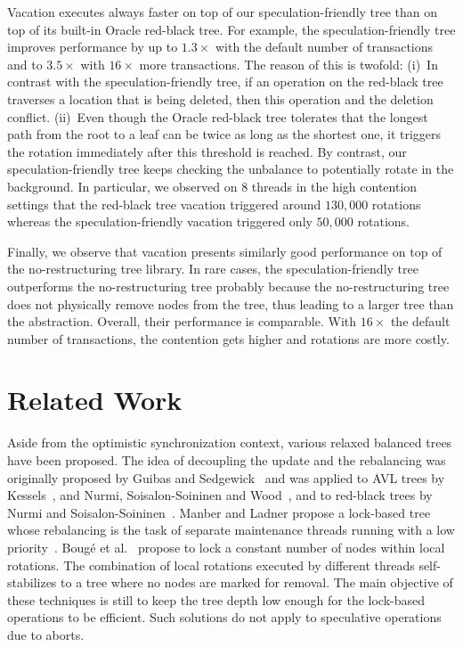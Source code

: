 Vacation executes always faster on top of our speculation-friendly tree than on top of its built-in Oracle red-black tree. 
For example, the speculation-friendly tree improves performance by up to $1.3\times$ with the default 
number of transactions and to $3.5\times$ with $16\times$ more transactions.
%
The reason of this is twofold: 
(i)~In contrast with the speculation-friendly tree, if an operation on the red-black tree traverses a location that is being 
deleted, then this operation and the deletion conflict. (ii)~Even though the Oracle red-black tree tolerates that the longest 
path from the root to a leaf can be twice as long as the shortest one, it triggers the rotation immediately after this threshold
is reached. By contrast, our speculation-friendly tree keeps checking the unbalance to potentially rotate in the background.
In particular, 
we observed on 8 threads in the high contention settings that the red-black tree vacation triggered around 
$130,000$ rotations whereas the speculation-friendly vacation triggered only $50,000$ rotations.

Finally, we observe that vacation presents similarly good performance on top of the no-restructuring tree library.
In rare cases, the speculation-friendly tree outperforms the no-restructuring tree probably because the no-restructuring tree
does not physically remove nodes from the tree,  thus leading to a larger tree than the abstraction.
Overall, their performance is comparable. With $16\times$ the default number of transactions,
the contention gets higher and rotations are more costly.

\section{Related Work}\label{sec:rw}

Aside from the optimistic synchronization context, various relaxed balanced trees have been proposed.
The idea of decoupling the update and the rebalancing was originally 
proposed by Guibas and Sedgewick~\cite{GS78} and was applied to AVL trees by Kessels~\cite{Kes83}, and 
Nurmi, Soisalon-Soininen and Wood~\cite{NSW87},
and to red-black trees by Nurmi and Soisalon-Soininen~\cite{NS98}.
Manber and Ladner propose a lock-based tree whose rebalancing is the task of separate maintenance threads running with a 
low priority~\cite{UR84}.  
Boug\'e et al.~\cite{IRISAppr} propose to lock a constant number of nodes within local rotations. 
The combination of local rotations executed by different threads self-stabilizes to a tree where no nodes are marked for removal.
The main objective of these techniques is still to keep the tree depth low enough for the lock-based operations to be efficient.
Such solutions do not apply to speculative operations due to aborts.
 
